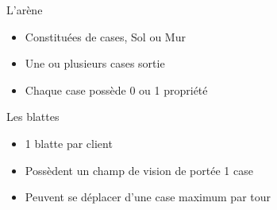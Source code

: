 \begin{frame}[c]{}
    \begin{block}{L'arène}
        \begin{itemize}
        \item Constituées de cases, Sol ou Mur
        \item Une ou plusieurs cases sortie
        \item Chaque case possède 0 ou 1 propriété
        \end{itemize}
    \end{block}
    
    \pause
    
    \begin{block}{Les blattes}
        \begin{itemize}
        \item 1 blatte par client
        \item Possèdent un champ de vision de portée 1 case
        \item Peuvent se déplacer d'une case maximum par tour
        \end{itemize}
    \end{block}
\end{frame}